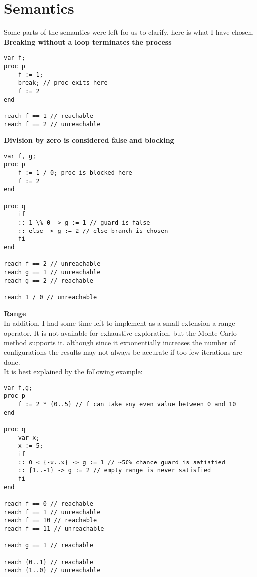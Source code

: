 \section{Semantics}

Some parts of the semantics were left for us to clarify, here is what I have chosen.\\

\textbf{Breaking without a loop terminates the process}
\begin{lstlisting}
var f;
proc p
    f := 1;
    break; // proc exits here
    f := 2
end

reach f == 1 // reachable
reach f == 2 // unreachable
\end{lstlisting}


\textbf{Division by zero is considered false and blocking}
\begin{lstlisting}
var f, g;
proc p
    f := 1 / 0; proc is blocked here
    f := 2
end

proc q
    if
    :: 1 \% 0 -> g := 1 // guard is false
    :: else -> g := 2 // else branch is chosen
    fi
end

reach f == 2 // unreachable
reach g == 1 // unreachable
reach g == 2 // reachable

reach 1 / 0 // unreachable
\end{lstlisting}

\textbf{Range}\\
In addition, I had some time left to implement as a small extension
a range operator. It is not available for exhaustive exploration,
but the Monte-Carlo method supports it, although since it exponentially
increases the number of configurations the results may not always be
accurate if too few iterations are done.\\
It is best explained by the following example:
\begin{lstlisting}
var f,g;
proc p
    f := 2 * {0..5} // f can take any even value between 0 and 10
end

proc q
    var x;
    x := 5;
    if
    :: 0 < {-x..x} -> g := 1 // ~50% chance guard is satisfied
    :: {1..-1} -> g := 2 // empty range is never satisfied
    fi
end

reach f == 0 // reachable
reach f == 1 // unreachable
reach f == 10 // reachable
reach f == 11 // unreachable

reach g == 1 // reachable

reach {0..1} // reachable
reach {1..0} // unreachable
\end{lstlisting}


